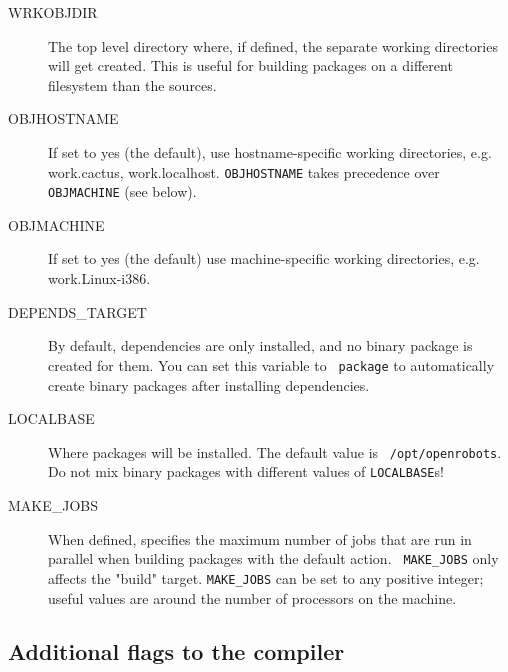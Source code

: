 \begin{description}
   \item[WRKOBJDIR] The top level   directory where, if defined,  the  separate
   working directories will get created.  This is useful for building  packages
   on a different filesystem than the \robotpkg sources.

   \item[OBJHOSTNAME] If set to yes (the default), use hostname-specific
   working directories, e.g. work.cactus, work.localhost. {\tt OBJHOSTNAME}
   takes precedence over {\tt OBJMACHINE} (see below).

   \item[OBJMACHINE] If set to yes (the default) use machine-specific working
   directories, e.g. work.Linux-i386.

   \item[DEPENDS\_TARGET] By default,  dependencies are only installed,  and no
   binary package is  created  for them. You  can  set  this variable  to  {\tt
   package}   to   automatically  create    binary  packages   after installing
   dependencies.

   \item[LOCALBASE] Where packages will be installed. The default value is {\tt
   /opt/openrobots}.  Do not  mix     binary  packages with    different values
   of {\tt LOCALBASE}s!

   \item[MAKE\_JOBS] When defined, specifies the maximum number of jobs that
   are run in parallel when building packages with the default action. {\tt
   MAKE\_JOBS} only affects the "build" target. {\tt MAKE\_JOBS} can be set to
   any positive integer; useful values are around the number of processors on
   the machine.


\end{description}


\subsection{Additional flags to the compiler} %

